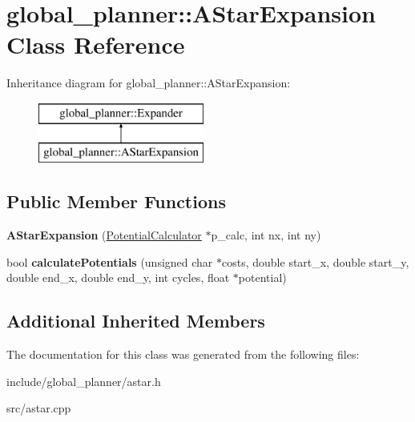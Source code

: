 \hypertarget{classglobal__planner_1_1_a_star_expansion}{}\section{global\+\_\+planner\+:\+:A\+Star\+Expansion Class Reference}
\label{classglobal__planner_1_1_a_star_expansion}
Inheritance diagram for global\+\_\+planner\+:\+:A\+Star\+Expansion\+:\begin{figure}[H]
\begin{center}
\leavevmode
\includegraphics[height=2.000000cm]{classglobal__planner_1_1_a_star_expansion}
\end{center}
\end{figure}
\subsection*{Public Member Functions}
\begin{DoxyCompactItemize}
\item 
\mbox{\label{classglobal__planner_1_1_a_star_expansion_a3a1f2f9b946d0e69afce5886cf7d56fa}} 
{\bfseries A\+Star\+Expansion} (\mbox{\hyperlink{classglobal__planner_1_1_potential_calculator}{Potential\+Calculator}} $\ast$p\+\_\+calc, int nx, int ny)
\item 
\mbox{\label{classglobal__planner_1_1_a_star_expansion_a71ddf1440a2f487c6f10af7a25757371}} 
bool {\bfseries calculate\+Potentials} (unsigned char $\ast$costs, double start\+\_\+x, double start\+\_\+y, double end\+\_\+x, double end\+\_\+y, int cycles, float $\ast$potential)
\end{DoxyCompactItemize}
\subsection*{Additional Inherited Members}


The documentation for this class was generated from the following files\+:\begin{DoxyCompactItemize}
\item 
include/global\+\_\+planner/astar.\+h\item 
src/astar.\+cpp\end{DoxyCompactItemize}
